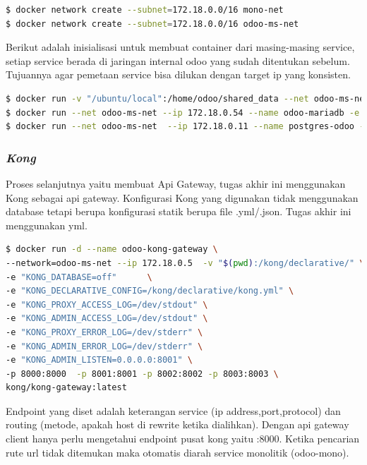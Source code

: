 \begin{lstlisting}[style=mystyle, language=sh, caption={Shell Script untuk pembuatan jaringan }]
$ docker network create --subnet=172.18.0.0/16 mono-net
$ docker network create --subnet=172.18.0.0/16 odoo-ms-net	
\end{lstlisting} 

Berikut adalah inisialisasi untuk membuat container dari masing-masing service, setiap service berada di jaringan internal odoo yang sudah ditentukan sebelum. Tujuannya agar pemetaan service bisa dilukan dengan target ip yang konsisten.

\begin{lstlisting}[style=mystyle, language=sh, caption={Shell Script untuk pembuatan container }]
$ docker run -v "/ubuntu/local":/home/odoo/shared_data --net odoo-ms-net  --ip 172.18.0.55 --name odoo-mono -p :8069  -d odoo-mono
$ docker run --net odoo-ms-net --ip 172.18.0.54 --name odoo-mariadb -e MYSQL_ROOT_PASSWORD=mariadb -p 3306:3306 -d mariadb 
$ docker run --net odoo-ms-net  --ip 172.18.0.11 --name postgres-odoo -e POSTGRES_PASSWORD=postgres -p 5432:5432 -d postgres
\end{lstlisting} 

\subsubsection{\textit{Kong}}
Proses selanjutnya yaitu membuat Api Gateway, tugas akhir ini menggunakan Kong sebagai api gateway. Konfigurasi Kong yang digunakan tidak menggunakan database tetapi berupa konfigurasi statik berupa file .yml/.json. Tugas akhir ini menggunakan yml.

\begin{lstlisting}[style=mystyle, language=sh, caption={Shell Script untuk pembuatan container }]
$ docker run -d --name odoo-kong-gateway \
--network=odoo-ms-net --ip 172.18.0.5  -v "$(pwd):/kong/declarative/" \
-e "KONG_DATABASE=off" 		\
-e "KONG_DECLARATIVE_CONFIG=/kong/declarative/kong.yml" \
-e "KONG_PROXY_ACCESS_LOG=/dev/stdout" \
-e "KONG_ADMIN_ACCESS_LOG=/dev/stdout" \		
-e "KONG_PROXY_ERROR_LOG=/dev/stderr" \
-e "KONG_ADMIN_ERROR_LOG=/dev/stderr" \
-e "KONG_ADMIN_LISTEN=0.0.0.0:8001" \
-p 8000:8000  -p 8001:8001 -p 8002:8002 -p 8003:8003 \
kong/kong-gateway:latest 
\end{lstlisting} 

Endpoint yang diset adalah keterangan service (ip address,port,protocol) dan routing (metode, apakah host di rewrite ketika dialihkan). Dengan api gateway client hanya perlu mengetahui endpoint pusat kong yaitu :8000. Ketika pencarian rute url tidak ditemukan maka otomatis diarah service monolitik (odoo-mono).

